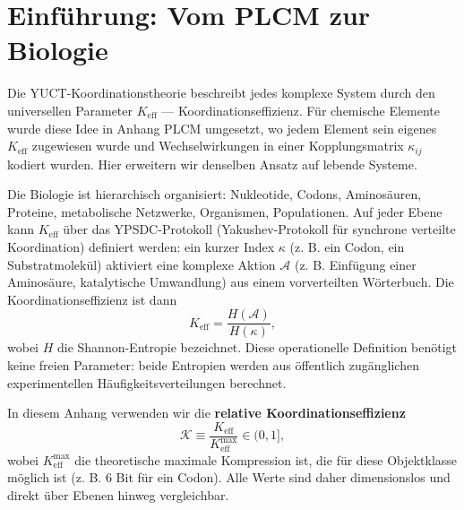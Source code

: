 \documentclass[12pt,a4paper]{article}
\newcommand{\REL}{\mathcal{K}}          %
\begin{document}
	\tableofcontents
	\newpage
	
	\section{Einführung: Vom PLCM zur Biologie}
	Die YUCT-Koordinationstheorie beschreibt jedes komplexe System durch den universellen Parameter \(K_{\mathrm{eff}}\) — Koordinationseffizienz. Für chemische Elemente wurde diese Idee in Anhang PLCM umgesetzt, wo jedem Element sein eigenes \(K_{\mathrm{eff}}\) zugewiesen wurde und Wechselwirkungen in einer Kopplungsmatrix \(\kappa_{ij}\) kodiert wurden. Hier erweitern wir denselben Ansatz auf lebende Systeme.
	
	Die Biologie ist hierarchisch organisiert: Nukleotide, Codons, Aminosäuren, Proteine, metabolische Netzwerke, Organismen, Populationen. Auf jeder Ebene kann \(K_{\mathrm{eff}}\) über das YPSDC-Protokoll (Yakushev-Protokoll für synchrone verteilte Koordination) definiert werden: ein kurzer Index \(\kappa\) (z. B. ein Codon, ein Substratmolekül) aktiviert eine komplexe Aktion \(\mathcal{A}\) (z. B. Einfügung einer Aminosäure, katalytische Umwandlung) aus einem vorverteilten Wörterbuch. Die Koordinationseffizienz ist dann
	\[
	K_{\mathrm{eff}} = \frac{H(\mathcal{A})}{H(\kappa)},
	\]
	wobei \(H\) die Shannon-Entropie bezeichnet. Diese operationelle Definition benötigt keine freien Parameter: beide Entropien werden aus öffentlich zugänglichen experimentellen Häufigkeitsverteilungen berechnet.
	
	In diesem Anhang verwenden wir die \textbf{relative Koordinationseffizienz}
	\[
	\REL \equiv \frac{K_{\mathrm{eff}}}{K_{\mathrm{eff}}^{\max}} \in (0,1],
	\]
	wobei \(K_{\mathrm{eff}}^{\max}\) die theoretische maximale Kompression ist, die für diese Objektklasse möglich ist (z. B. 6 Bit für ein Codon). Alle Werte sind daher dimensionslos und direkt über Ebenen hinweg vergleichbar.
	
\end{document}
